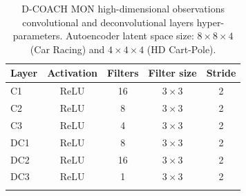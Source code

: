 \begin{table}[H]
\parbox{\linewidth}{
\centering
\caption[High-dimensional observation D-COACH MON convolutional and deconvolutional layers hyper-parameters]{D-COACH MON high-dimensional observations convolutional and deconvolutional layers hyper-parameters. Autoencoder latent space size: $8\times8\times4$ (Car Racing) and $4\times4\times4$ (HD Cart-Pole).}
\label{table:mon_hypers1}
\begin{tabular}{lcccc}
\textbf{Layer} & \multicolumn{1}{l}{\textbf{Activation}} & \multicolumn{1}{l}{\textbf{Filters}} & \multicolumn{1}{l}{\textbf{Filter size}} & \multicolumn{1}{l}{\textbf{Stride}} \\ \hline \hline
C1             & ReLU                                    & 16                                   & $3\times3$                                    & 2                                   \\ \hline
C2             & ReLU                                    & 8                                    & $3\times3$                                    & 2                                   \\ \hline
C3             & ReLU                                    & 4                                    & $3\times3$                                    & 2                                   \\ \hline
DC1            & ReLU                                    & 8                                    & $3\times3$                                    & 2                                   \\ \hline
DC2            & ReLU                                    & 16                                   & $3\times3$                                    & 2                                   \\ \hline
DC3            & ReLU                                    & 1                                    & $3\times3$                                    & 2                                   \\ \hline
\vspace{0.2cm}
\end{tabular}}
\end{table}

